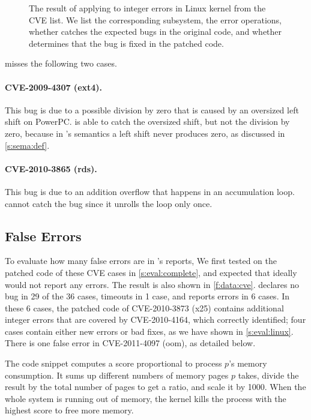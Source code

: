 \begin{figure*}
\centering
\footnotesize

\caption{The result of applying \sys to integer errors in Linux
kernel from the CVE list.  We list the corresponding
subsystem, the error operations, whether \sys catches the expected
bugs in the original code, and whether \sys determines that the bug
is fixed in the patched code.}
\label{f:data:cve}
\end{figure*}

\sys misses the following two cases.

\paragraph{CVE-2009-4307 (ext4).}
This bug is due to a possible division by zero that is caused by
an oversized left shift on PowerPC.  \sys is able to catch the
oversized shift, but not the division by zero, because in \sys's
semantics a left shift never produces zero, as discussed in
\autoref{s:sema:def}.

\paragraph{CVE-2010-3865 (rds).}
This bug is due to an addition overflow that happens in an accumulation
loop.  \sys cannot catch the bug since it unrolls the loop only
once.

\subsection{False Errors}

To evaluate how many false errors are in \sys's reports,
We first tested \sys on the patched code of these CVE cases
in \autoref{s:eval:complete},
and expected that ideally \sys would not report any errors.
The result is also shown in \autoref{f:data:cve}.
\sys declares no bug in 29 of the 36 cases, timeouts in 1 case, and
reports errors in 6 cases.
%
In these 6 cases,
the patched code of CVE-2010-3873 (x25)
contains additional integer errors that are covered by CVE-2010-4164,
which \sys correctly identified;
four cases contain either new errors or bad fixes,
as we have shown in \autoref{s:eval:linux}.
There is one false error in CVE-2011-4097 (oom), as detailed below.


The code snippet
computes a score proportional to process $p$'s memory consumption.
It sums up different numbers of
memory pages $p$ takes, divide the result by the total number
of pages to get a ratio, and scale it by 1000.
When the whole system is running out of memory,
the kernel kills the process with the highest score
to free more memory.

